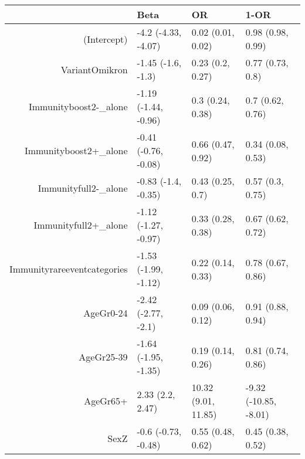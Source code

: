 \begin{table}[ht]
\centering
\begin{tabular}{rlll}
  \hline
 & Beta & OR & 1-OR \\ 
  \hline
(Intercept) & -4.2 (-4.33, -4.07) & 0.02 (0.01, 0.02) & 0.98 (0.98, 0.99) \\ 
  VariantOmikron & -1.45 (-1.6, -1.3) & 0.23 (0.2, 0.27) & 0.77 (0.73, 0.8) \\ 
  Immunityboost2-\_alone & -1.19 (-1.44, -0.96) & 0.3 (0.24, 0.38) & 0.7 (0.62, 0.76) \\ 
  Immunityboost2+\_alone & -0.41 (-0.76, -0.08) & 0.66 (0.47, 0.92) & 0.34 (0.08, 0.53) \\ 
  Immunityfull2-\_alone & -0.83 (-1.4, -0.35) & 0.43 (0.25, 0.7) & 0.57 (0.3, 0.75) \\ 
  Immunityfull2+\_alone & -1.12 (-1.27, -0.97) & 0.33 (0.28, 0.38) & 0.67 (0.62, 0.72) \\ 
  Immunityrareeventcategories & -1.53 (-1.99, -1.12) & 0.22 (0.14, 0.33) & 0.78 (0.67, 0.86) \\ 
  AgeGr0-24 & -2.42 (-2.77, -2.1) & 0.09 (0.06, 0.12) & 0.91 (0.88, 0.94) \\ 
  AgeGr25-39 & -1.64 (-1.95, -1.35) & 0.19 (0.14, 0.26) & 0.81 (0.74, 0.86) \\ 
  AgeGr65+ & 2.33 (2.2, 2.47) & 10.32 (9.01, 11.85) & -9.32 (-10.85, -8.01) \\ 
  SexZ & -0.6 (-0.73, -0.48) & 0.55 (0.48, 0.62) & 0.45 (0.38, 0.52) \\ 
   \hline
\end{tabular}
\end{table}
